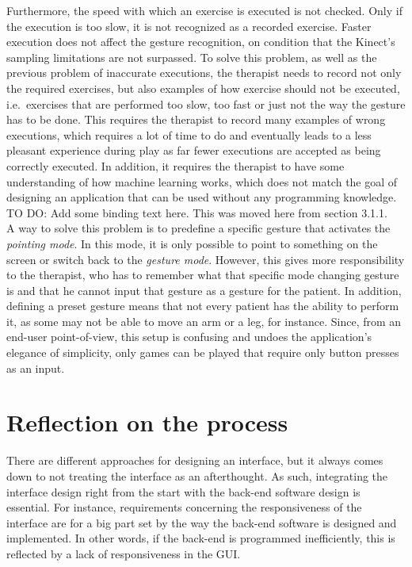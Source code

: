 Furthermore, the speed with which an exercise is executed is not checked. Only if the execution is too slow, it is not recognized as a recorded exercise. Faster execution does not affect the gesture recognition, on condition that the Kinect's sampling limitations are not surpassed. To solve this problem, as well as the previous problem of inaccurate executions, the therapist needs to record not only the required exercises, but also examples of how exercise should not be executed, i.e.\ exercises that are performed too slow, too fast or just not the way the gesture has to be done. This requires the therapist to record many examples of wrong executions, which requires a lot of time to do and eventually leads to a less pleasant experience during play as far fewer executions are accepted as being correctly executed. In addition, it requires the therapist to have some understanding of how machine learning works, which does not match the goal of designing an application that can be used without any programming knowledge.\\


TO DO: Add some binding text here. This was moved here from section 3.1.1.\\
A way to solve this problem is to predefine a specific gesture that activates the \emph{pointing mode}. In this mode, it is only possible to point to something on the screen or switch back to the \emph{gesture mode}. However, this gives more responsibility to the therapist, who has to remember what that specific mode changing gesture is and that he cannot input that gesture as a gesture for the patient. In addition, defining a preset gesture means that not every patient has the ability to perform it, as some may not be able to move an arm or a leg, for instance. Since, from an end-user point-of-view, this setup is confusing and undoes the application's elegance of simplicity, only games can be played that require only button presses as an input.





\section{Reflection on the process}

There are different approaches for designing an interface, but it always comes down to not treating the interface as an afterthought. As such, integrating the interface design right from the start with the back-end software design is essential. For instance, requirements concerning the responsiveness of the interface are for a big part set by the way the back-end software is designed and implemented. In other words, if the back-end is programmed inefficiently, this is reflected by a lack of responsiveness in the GUI.\\


